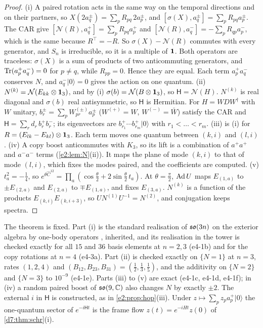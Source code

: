 \begin{proof}
(i) A paired rotation acts in the same way on the temporal directions and on their partners, so $X(2a^\pm_q)=\sum_pR_{pq}\,2a^\pm_p$, and
$[\sigma(X),a^\pm_q]=\sum_pR_{pq}a^\pm_p$. The CAR give $[\mathcal N(R),a^+_q]=\sum_pR_{pq}a^+_p$ and $[\mathcal N(R),a^-_q]=-\sum_pR_{qp}a^-_p$,
which is the same because $R^{\!\top}=-R$. So $\sigma(X)-\mathcal N(R)$ commutes with every generator, and $S_n$ is irreducible, so it is a multiple
of $\mathbf 1$. Both operators are traceless: $\sigma(X)$ is a sum of products of two anticommuting generators, and $\operatorname{Tr}(a^+_pa^-_q)=0$ for $p\neq q$, while
$R_{pp}=0$. Hence they are equal. Each term $a^+_pa^-_q$ conserves $N$, and $a^-_q|0\rangle=0$ gives the action on one quantum. (ii)
$N^{(k)}=\mathcal N(E_{kk}\otimes\mathbf 1_3)$, and by (i) $\sigma(b)=\mathcal N(B\otimes\mathbf 1_3)$, so $\mathsf H=\mathcal N(H)$. $N^{(k)}$ is real diagonal and
$\sigma(b)$ real antisymmetric, so $\mathsf H$ is Hermitian. For $H=WDW^\dagger$ with $W$ unitary, $b^\pm_r=\sum_pW_{pr}^{(\pm)}a^\pm_p$ ($W^{(+)}=W$,
$W^{(-)}=\bar W$) satisfy the CAR and $\mathsf H=\sum_rd_r\,b^+_rb^-_r$; its eigenvectors are $b^+_{r_1}\cdots b^+_{r_m}|0\rangle$ with $r_1<\dots<r_m$. (iii) is
(i) for $R=(E_{lk}-E_{kl})\otimes\mathbf 1_3$. Each term moves one quantum between $(k,i)$ and $(l,i)$. (iv) A copy boost anticommutes with $K_3$, so its
lift is a combination of $a^+a^+$ and $a^-a^-$ terms (\cref{e2:lem:N}(ii)). It maps the plane of mode $(k,i)$ to that of mode $(l,i)$, which fixes
the modes paired, and the coefficients are computed. (v) $t_a^2=-\tfrac14$, so
$e^{\theta\hat C^{12}}=\prod_a(\cos\tfrac\theta2+2\sin\tfrac\theta2\,t_a)$. At $\theta=\tfrac\pi2$, $\operatorname{Ad} U$ maps $E_{(1,a)}$ to $\pm E_{(2,a)}$ and $E_{(2,a)}$ to
$\mp E_{(1,a)}$, and fixes $E_{(3,a)}$. $N^{(k)}$ is a function of the products $E_{(k,i)}E_{(k,i+3)}$, so $UN^{(1)}U^{-1}=N^{(2)}$, and conjugation keeps
spectra.
\end{proof}

The theorem is fixed. Part (i) is the standard realisation of $\mathfrak{so}(3n)$ on the exterior algebra by one-body operators
\cite{Chevalley54,Fock32}, inherited, and its realisation in the tower is checked exactly for all $15$ and $36$ basis elements at $n=2,3$
(e4-1b) and for the copy rotations at $n=4$ (e4-3a). Part (ii) is checked exactly on $\{N=1\}$ at $n=3$, rates $(1,2,4)$ and
$(B_{12},B_{23},B_{31})=(\tfrac12,\tfrac13,\tfrac15)$, and the additivity on $\{N=2\}$ and $\{N=3\}$ to $10^{-9}$ (e4-1e). Parts (iii) to (v) are exact
(e4-1c, e4-1d, e4-1f); in (iv) a random paired boost of $\mathfrak{so}(9,\mathbb{C})$ also changes $N$ by exactly $\pm2$. The external $i$ in $\mathsf H$ is constructed,
as in \cref{e2:prop:hop}(iii). Under $z\mapsto\sum_pz_pa^+_p|0\rangle$ the one-quantum sector of $e^{-i\mathsf Ht}$ is the frame flow $z(t)=e^{-iHt}z(0)$ of
\cref{d7:thm:schr}(i).

